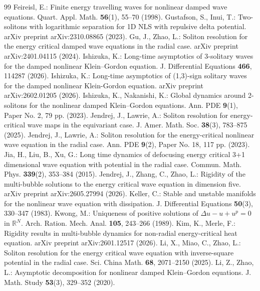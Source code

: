 \documentclass[10pt,a4paper]{amsart}
\numberwithin{equation}{section}
\begin{document}
\begin{thebibliography}{99}
 Feireisl, E.: Finite energy travelling waves for nonlinear damped wave equations. Quart. Appl. Math. \textbf{56}(1), 55--70 (1998).
 Gustafson, S., Inui, T.: Two-solitons with logarithmic separation for 1D NLS with repulsive delta potential. arXiv preprint arXiv:2310.08865 (2023).
 Gu, J., Zhao, L.: Soliton resolution for the energy critical damped wave equations in the radial case. arXiv preprint arXiv:2401.04115 (2024).
 Ishizuka, K.: Long-time asymptotics of 3-solitary waves for the damped nonlinear Klein--Gordon equation. J. Differential Equations \textbf{466}, 114287 (2026).
 Ishizuka, K.: Long-time asymptotics of (1,3)-sign solitary waves for the damped nonlinear Klein-Gordon equation. arXiv preprint arXiv:2602.01205 (2026).
 Ishizuka, K., Nakanishi, K.: Global dynamics around 2-solitons for the nonlinear damped Klein--Gordon equations. Ann. PDE \textbf{9}(1), Paper No. 2, 79 pp. (2023).
 Jendrej, J., Lawrie, A.: Soliton resolution for energy-critical wave maps in the equivariant case. J. Amer. Math. Soc. \textbf{38}(3), 783--875 (2025).
 Jendrej, J., Lawrie, A.: Soliton resolution for the energy-critical nonlinear wave equation in the radial case. Ann. PDE \textbf{9}(2), Paper No. 18, 117 pp. (2023).
 Jia, H., Liu, B., Xu, G.: Long time dynamics of defocusing energy critical 3+1 dimensional wave equation with potential in the radial case. Commun. Math. Phys. \textbf{339}(2), 353--384 (2015).
 Jendrej, J., Zhang, C., Zhao, L.: Rigidity of the multi-bubble solutions to the energy critical wave equation in dimension five. arXiv preprint arXiv:2605.27994 (2026).
 Keller, C.: Stable and unstable manifolds for the nonlinear wave equation with dissipation. J. Differential Equations \textbf{50}(3), 330--347 (1983).
 Kwong, M.: Uniqueness of positive solutions of $\Delta u-u+u^p=0$ in $\mathbb{R}^N$. Arch. Ration. Mech. Anal. \textbf{105}, 243--266 (1989).
 Kim, K., Merle, F.: Rigidity results in multi-bubble dynamics for non-radial energy-critical heat equation. arXiv preprint arXiv:2601.12517 (2026).
 Li, X., Miao, C., Zhao, L.: Soliton resolution for the energy critical wave equation with inverse-square potential in the radial case. Sci. China Math. \textbf{68}, 2071--2150 (2025).
 Li, Z., Zhao, L.: Asymptotic decomposition for nonlinear damped Klein--Gordon equations. J. Math. Study \textbf{53}(3), 329--352 (2020).

\end{thebibliography}
\end{document}
